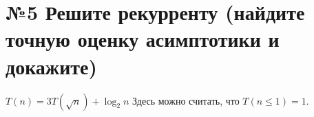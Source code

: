 
\section*{№5 Решите рекурренту (найдите точную оценку асимптотики и докажите)}

$T(n) = 3 T(\sqrt{n}) + \log_2 n$ Здесь можно считать, что $T(n \le 1) = 1$.

